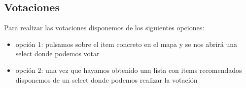\subsection{Votaciones}

Para realizar las votaciones disponemos de los siguientes opciones:

\begin{itemize}
	\item opción 1: pulsamos sobre el item concreto en el mapa y se nos abrirá una select donde podemos votar
	\item opción 2: una vez que hayamos obtenido una lista con items recomendados disponemos de un select donde podemos realizar la votación
\end{itemize}

